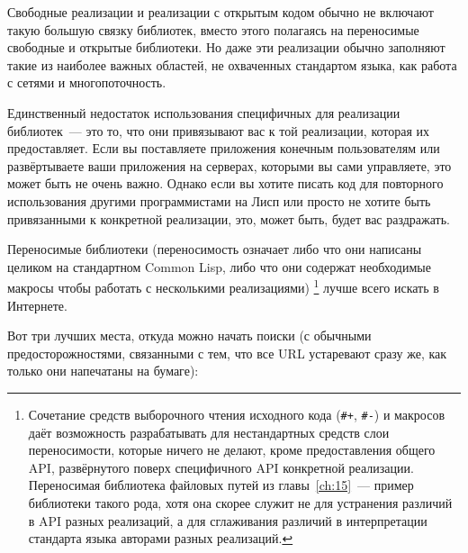 Свободные реализации и реализации с открытым кодом обычно не включают такую большую связку
библиотек, вместо этого полагаясь на переносимые свободные и открытые библиотеки. Но даже
эти реализации обычно заполняют такие из наиболее важных областей, не охваченных
стандартом языка, как работа с сетями и многопоточность.

Единственный недостаток использования специфичных для реализации библиотек~--- это то, что
они привязывают вас к той реализации, которая их предоставляет. Если вы поставляете
приложения конечным пользователям или развёртываете ваши приложения на серверах, которыми
вы сами управляете, это может быть не очень важно. Однако если вы хотите писать код для
повторного использования другими программистами на Лисп или просто не хотите быть
привязанными к конкретной реализации, это, может быть, будет вас раздражать.

Переносимые библиотеки (переносимость означает либо что они написаны целиком на
стандартном Common Lisp, либо что они содержат необходимые макросы чтобы работать с
несколькими реализациями) \footnote{Сочетание средств выборочного чтения исходного кода
  (\lstinline!#+!, \lstinline!#-!) и макросов даёт возможность разрабатывать для
  нестандартных средств слои переносимости, которые ничего не делают, кроме предоставления
  общего API, развёрнутого поверх специфичного API конкретной реализации. Переносимая
  библиотека файловых путей из главы~\ref{ch:15}~--- пример библиотеки такого рода, хотя
  она скорее служит не для устранения различий в API разных реализаций, а для сглаживания
  различий в интерпретации стандарта языка авторами разных реализаций.} лучше всего искать
в Интернете.

Вот три лучших места, откуда можно начать поиски (с обычными предосторожностями,
связанными с тем, что все URL устаревают сразу же, как только они напечатаны на бумаге):

